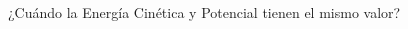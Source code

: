 ¿Cuándo la Energía Cinética y Potencial tienen el mismo valor?


\begin{solutionbox}{1.2cm}

\end{solutionbox}
